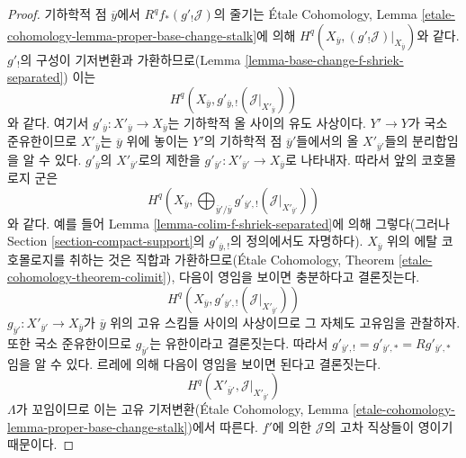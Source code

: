 \begin{proof}
\medskip\noindent
기하학적 점 $\overline{y}$에서 $R^qf_*(g'_!\mathcal{J})$의 줄기는
\'Etale Cohomology, Lemma
\ref{etale-cohomology-lemma-proper-base-change-stalk}에 의해
$H^q(X_{\overline{y}}, (g'_!\mathcal{J})|_{X_{\overline{y}}})$와 같다.
$g'_!$의 구성이 기저변환과 가환하므로(Lemma
\ref{lemma-base-change-f-shriek-separated}) 이는
$$
H^q(X_{\overline{y}}, g'_{\overline{y}, !}(\mathcal{J}|_{X'_{\overline{y}}}))
$$
와 같다. 여기서
$g'_{\overline{y}} : X'_{\overline{y}} \to X_{\overline{y}}$는
기하학적 올 사이의 유도 사상이다. $Y' \to Y$가 국소 준유한이므로
$X'_{\overline{y}}$는 $\overline{y}$ 위에 놓이는 $Y'$의 기하학적 점
$\overline{y}'$들에서의 올 $X'_{\overline{y}'}$들의 분리합임을 알 수
있다. $g'_{\overline{y}}$의 $X'_{\overline{y}'}$로의 제한을
$g'_{\overline{y}'} : X'_{\overline{y}'} \to X_{\overline{y}}$로
나타내자. 따라서 앞의 코호몰로지 군은
$$
H^q(X_{\overline{y}},
\bigoplus\nolimits_{\overline{y}'/\overline{y}}
g'_{\overline{y}', !}(\mathcal{J}|_{X'_{\overline{y}'}}))
$$
와 같다. 예를 들어 Lemma \ref{lemma-colim-f-shriek-separated}에 의해
그렇다(그러나 Section \ref{section-compact-support}의
$g'_{\overline{y}, !}$의 정의에서도 자명하다). $X_{\overline{y}}$ 위의
에탈 코호몰로지를 취하는 것은 직합과 가환하므로(\'Etale Cohomology,
Theorem \ref{etale-cohomology-theorem-colimit}), 다음이 영임을 보이면
충분하다고 결론짓는다.
$$
H^q(X_{\overline{y}}, g'_{\overline{y}', !}(\mathcal{J}|_{X'_{\overline{y}'}}))
$$
$g_{\overline{y}'} : X'_{\overline{y}'} \to X_{\overline{y}}$가
$\overline{y}$ 위의 고유 스킴들 사이의 사상이므로 그 자체도
고유임을 관찰하자. 또한 국소 준유한이므로
$g_{\overline{y}'}$는 유한이라고 결론짓는다. 따라서
$g'_{\overline{y}', !} = g'_{\overline{y}', *} =
Rg'_{\overline{y}', *}$임을 알 수 있다. 르레에 의해 다음이 영임을
보이면 된다고 결론짓는다.
$$
H^q(X'_{\overline{y}'}, \mathcal{J}|_{X'_{\overline{y}'}})
$$
$\Lambda$가 꼬임이므로 이는 고유 기저변환(\'Etale Cohomology, Lemma
\ref{etale-cohomology-lemma-proper-base-change-stalk})에서 따른다.
$f'$에 의한 $\mathcal{J}$의 고차 직상들이 영이기 때문이다.


\end{proof}

